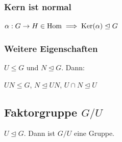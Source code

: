 \subsubsection*{Kern ist normal}
$\alpha: G \to H \in \operatorname{Hom} \implies \operatorname{Ker}(\alpha) \trianglelefteq G$

\subsubsection*{Weitere Eigenschaften}
$U \le G$ und $N \trianglelefteq G$. Dann:

$UN \le G$, $N \trianglelefteq UN$, $U \cap N \trianglelefteq U$

\subsection*{Faktorgruppe $G/U$}
$U \trianglelefteq G$. Dann ist $G/U$ eine Gruppe.
